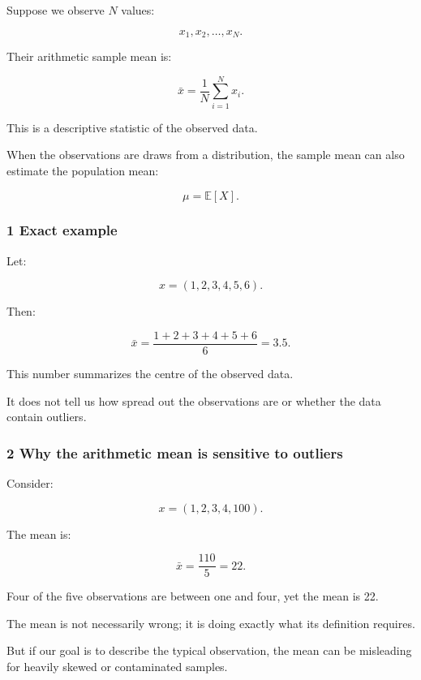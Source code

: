 \hypertarget{02-foundations-ii-ch030-sample-mean}{}

Suppose we observe \(N\) values:

\[
 x_1,x_2,\ldots,x_N.
\]

Their arithmetic sample mean is:

\[
 \boxed{ \bar x=\frac1N\sum_{i=1}^{N}x_i }.
\]

This is a descriptive statistic of the observed data.

When the observations are draws from a distribution, the sample mean can also estimate the population mean:

\[
 \mu=\mathbb E[X].
\]

\subsubsection{1 Exact example}\label{02-foundations-ii-ch030-exact-example}

\hypertarget{02-foundations-ii-ch030-exact-example}{}

Let:

\[
 x=(1,2,3,4,5,6).
\]

Then:

\[
 \bar x= \frac{1+2+3+4+5+6}{6} =\boxed{3.5}.
\]

This number summarizes the centre of the observed data.

It does not tell us how spread out the observations are or whether the data contain outliers.

\subsubsection{2 Why the arithmetic mean is sensitive to outliers}\label{02-foundations-ii-ch030-why-the-arithmetic-mean-is-sensitive-to-outliers}

\hypertarget{02-foundations-ii-ch030-why-the-arithmetic-mean-is-sensitive-to-outliers}{}

Consider:

\[
 x=(1,2,3,4,100).
\]

The mean is:

\[
 \bar x=\frac{110}{5}=\boxed{22}.
\]

Four of the five observations are between one and four, yet the mean is 22.

The mean is not necessarily wrong; it is doing exactly what its definition requires.

But if our goal is to describe the typical observation, the mean can be misleading for heavily skewed or contaminated samples.

